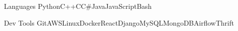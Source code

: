 \begin{siderules}


\begin{cvskills}


\cvskill
{Languages} %
{Python{\enskip\cdotp\enskip}C++{\enskip\cdotp\enskip}C{\enskip\cdotp\enskip}C\#{\enskip\cdotp\enskip}Java{\enskip\cdotp\enskip}JavaScript{\enskip\cdotp\enskip}Bash} %


\cvskill
{Dev Tools} 
{Git{\enskip\cdotp\enskip}AWS{\enskip\cdotp\enskip}Linux{\enskip\cdotp\enskip}Docker{\enskip\cdotp\enskip}React{\enskip\cdotp\enskip}Django{\enskip\cdotp\enskip}MySQL{\enskip\cdotp\enskip}MongoDB{\enskip\cdotp\enskip}Airflow{\enskip\cdotp\enskip}Thrift} 





\end{cvskills}
\end{siderules}